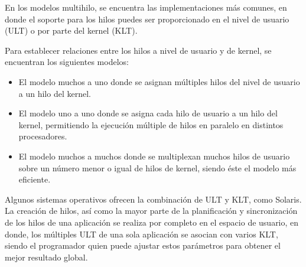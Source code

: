 \documentclass[12pt, letter]{article}
\begin{document}
\setlength{\parindent}{31pt}
En los modelos multihilo, se encuentra las implementaciones más comunes, en donde el soporte para los hilos puedes ser proporcionado en el nivel de usuario (ULT) o por parte del kernel (KLT).

\setlength{\parindent}{31pt}
Para establecer relaciones entre los hilos a nivel de usuario y de kernel, se encuentran los siguientes modelos: 

\begin{itemize}
\item El modelo muchos a uno donde se asignan múltiples hilos del nivel de usuario a un hilo del kernel.
\item El modelo uno a uno donde se asigna cada hilo de usuario a un hilo del kernel, permitiendo la ejecución múltiple de hilos en paralelo en distintos procesadores.
\item El modelo muchos a muchos donde se multiplexan muchos hilos de usuario sobre un número menor o igual de hilos de kernel, siendo éste el modelo más eficiente. 
\end{itemize}

\setlength{\parindent}{31pt}
Algunos sistemas operativos ofrecen la combinación de ULT y KLT, como Solaris. La creación de hilos, así como la mayor parte de la planificación y sincronización de los hilos de una aplicación se realiza por completo en el espacio de usuario, en donde, los múltiples ULT de una sola aplicación se asocian con varios KLT, siendo el programador quien puede ajustar estos parámetros para obtener el mejor resultado global.
\end{document}
